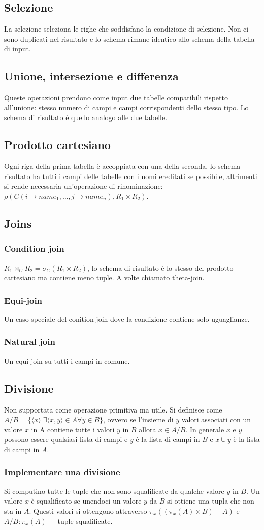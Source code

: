 \subsection{Selezione}
La selezione seleziona le righe che soddisfano la condizione di selezione. Non ci sono duplicati nel risultato e lo schema rimane identico allo schema della
tabella di input. 
\subsection{Unione, intersezione e differenza}
Queste operazioni prendono come input due tabelle compatibili rispetto all'unione: stesso numero di campi e campi corrispondenti dello stesso tipo. Lo 
schema di risultato \`e quello analogo alle due tabelle.
\subsection{Prodotto cartesiano}
Ogni riga della prima tabella \`e accoppiata con una della seconda, lo schema risultato ha tutti i campi delle tabelle con i nomi ereditati se possibile, 
altrimenti si rende necessaria un'operazione di rinominazione: $\rho(C(i\rightarrow name_1,\dots,  j\rightarrow name_n), R_1\times R_2)$.
\subsection{Joins}
\subsubsection{Condition join}
$R_1\bowtie_C R_2=\sigma_C(R_1\times R_2)$, lo schema di risultato \`e lo stesso del prodotto cartesiano ma contiene meno tuple. A volte chiamato theta-join.
\subsubsection{Equi-join}
Un caso speciale del conition join dove la condizione contiene solo uguaglianze. 
\subsubsection{Natural join}
Un equi-join su tutti i campi in comune. 
\subsection{Divisione}
Non supportata come operazione primitiva ma utile. Si definisce come $A/B=\{\langle x\rangle|\exists\langle x, y\rangle\in A \forall y\in B\}$, ovvero se 
l'insieme di $y$ valori associati con un valore $x$ in A contiene tutte i valori $y$ in $B$ allora $x\in A/B$. In generale $x$ e $y$ possono essere qualsiasi
lista di campi e $y$ \`e la lista di campi in $B$ e $x\cup y$ \`e la lista di campi in $A$. 
\subsubsection{Implementare una divisione}
Si computino tutte le tuple che non sono squalificate da qualche valore $y$ in $B$. Un valore $x$ \`e squalificato se unendoci un valore $y$ da $B$ si 
ottiene una tupla che non sta in $A$. Questi valori si ottengono attraverso $\pi_x((\pi_x(A)\times B)-A)$ e $A/B:\pi_x(A)-$ tuple squalificate.  
